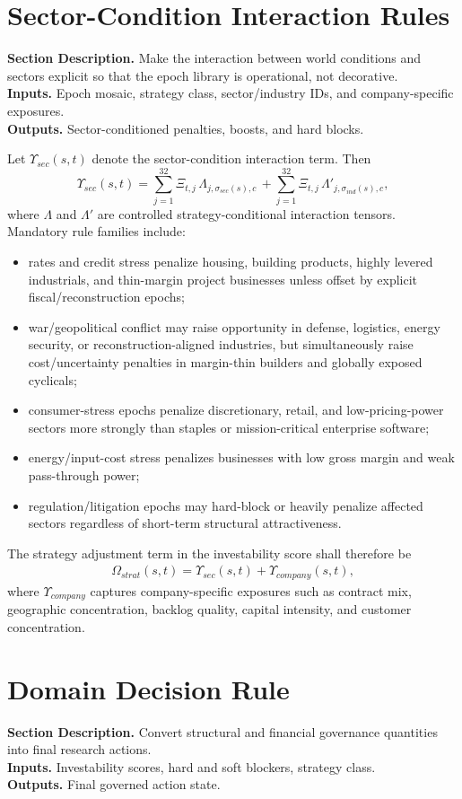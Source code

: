 \documentclass[11pt]{report}
\newcommand{\meta}[3]{\textbf{Section Description.} #1\\
\textbf{Inputs.} #2\\
\textbf{Outputs.} #3\par}
\begin{document}
\section{Sector-Condition Interaction Rules}
\meta{Make the interaction between world conditions and sectors explicit so that the epoch library is operational, not decorative.}{Epoch mosaic, strategy class, sector/industry IDs, and company-specific exposures.}{Sector-conditioned penalties, boosts, and hard blocks.}

Let $\Upsilon_{sec}(s,t)$ denote the sector-condition interaction term. Then
\[
\Upsilon_{sec}(s,t)=\sum_{j=1}^{32}\Xi_{t,j}\,\Lambda_{j,\sigma_{sec}(s),c}\,+\sum_{j=1}^{32}\Xi_{t,j}\,\Lambda'_{j,\sigma_{ind}(s),c},
\]
where $\Lambda$ and $\Lambda'$ are controlled strategy-conditional interaction tensors. Mandatory rule families include:
\begin{itemize}
    \item rates and credit stress penalize housing, building products, highly levered industrials, and thin-margin project businesses unless offset by explicit fiscal/reconstruction epochs;
    \item war/geopolitical conflict may raise opportunity in defense, logistics, energy security, or reconstruction-aligned industries, but simultaneously raise cost/uncertainty penalties in margin-thin builders and globally exposed cyclicals;
    \item consumer-stress epochs penalize discretionary, retail, and low-pricing-power sectors more strongly than staples or mission-critical enterprise software;
    \item energy/input-cost stress penalizes businesses with low gross margin and weak pass-through power;
    \item regulation/litigation epochs may hard-block or heavily penalize affected sectors regardless of short-term structural attractiveness.
\end{itemize}
The strategy adjustment term in the investability score shall therefore be
\begin{align*}
\Omega_{strat}(s,t)=\Upsilon_{sec}(s,t)+\Upsilon_{company}(s,t),
\end{align*}
where $\Upsilon_{company}$ captures company-specific exposures such as contract mix, geographic concentration, backlog quality, capital intensity, and customer concentration.

\section{Domain Decision Rule}
\meta{Convert structural and financial governance quantities into final research actions.}{Investability scores, hard and soft blockers, strategy class.}{Final governed action state.}
\end{document}
